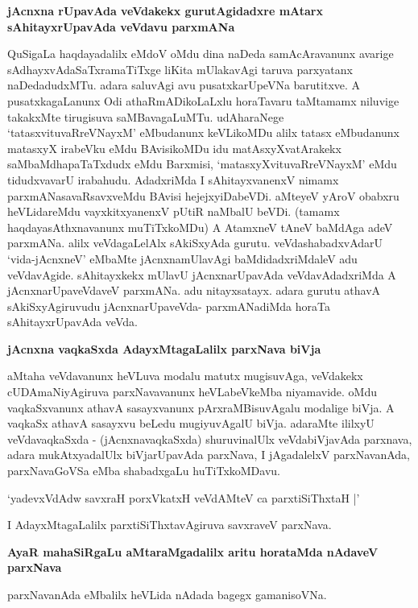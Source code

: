 {\bigskip
\noindent
{\large\bf jAcnxna rUpavAda veVdakekx gurutAgidadxre mAtarx sAhitayxrUpavAda veVdavu parxmANa}}\label{page137}
\medskip

\noindent
QuSigaLa haqdayadalilx eMdoV oMdu dina naDeda samAcAravanunx avarige sAdhayxvAdaSaTxra\-maTiTxge liKita mUlakavAgi taruva parxyatanx naDedadudxMTu. adara saluvAgi avu pusatxkarUpeVNa baru\-titxve. A pusatxkagaLanunx Odi athaRmADikoLaLxlu horaTavaru taMtamamx niluvige takakxMte tirugisuva saMBava\-gaLuMTu. udAharaNege `tatasxvituvaRreVNayxM' eMbudanunx keVLikoMDu alilx tatasx eMbudanunx matasxyX irabeVku eMdu BAvisikoMDu idu matAsxyXvatArakekx saMbaMdhapaTaTxdudx eMdu Barxmisi, `matasxyXvitu\-vaRreVNayxM' eMdu tidudxvavarU irabahudu. AdadxriMda I sAhitayxvanenxV nimamx parxmANasavaRsavxveMdu BAvisi hejejxyiDabeVDi. aMteyeV yAroV obabxru heVLidareMdu vayxkitxyanenxV pUtiR naMbalU beVDi. (tamamx haqdayasAthxnavanunx muTiTxkoMDu) A AtamxneV tAneV baMdAga adeV parxmANa. alilx veVda\-gaLelAlx sAkiSxyAda gurutu. veVdashabadxvAdarU `vida-jAcnxneV' eMbaMte jAcnxnamUlavAgi baMdidadx\-riMdaleV adu veVdavAgide. sAhitayxkekx mUlavU jAcnxnarUpavAda veVdavAdadxriMda A jAcnxnarUpaveVdaveV parx\-mANa. adu nitayxsatayx. adara gurutu athavA sAkiSxyAgiruvudu jAcnxnarUpaveVda- parxmANa\-diMda horaTa sAhitayxrUpavAda veVda.

{\bigskip
\noindent
{\large\bf jAcnxna vaqkaSxda AdayxMtagaLalilx parxNava biVja}}\label{page138}
\medskip

\noindent
aMtaha veVdavanunx heVLuva modalu matutx mugisuvAga, veVdakekx cUDA\-maNi\-yAgiruva parxNava\-vanunx heVLabeVkeMba niyamavide. oMdu vaqkaSxvanunx athavA sasayxvanunx pArxraMBisuvAgalu moda\-lige biVja. A vaqkaSx athavA sasayxvu beLedu mugiyuvAgalU biVja. adaraMte ililxyU veVdavaqkaSxda -\- (jAcnxnavaqkaSxda) shuruvinalUlx veVdabiVjavAda parxnava, adara mukAtxyadalUlx biVjarUpavAda parxNava, I jAgadalelxV parxNavanAda, parxNavaGoVSa eMba shabadxgaLu huTiTxkoMDavu.

\begin{shloka}
`yadevxVdAdw savxraH porxVkatxH veVdAMteV ca parxtiSiThxtaH |'\label{138}
\end{shloka}

\noindent
I AdayxMtagaLalilx parxtiSiThxtavAgiruva savxraveV parxNava.

{\bigskip
\noindent
{\large\bf AyaR mahaSiRgaLu aMtaraMgadalilx aritu horataMda nAdaveV parxNava}}\label{page138}
\medskip

\noindent
parxNavanAda eMbalilx heVLida nAdada bagegx gamanisoVNa.

